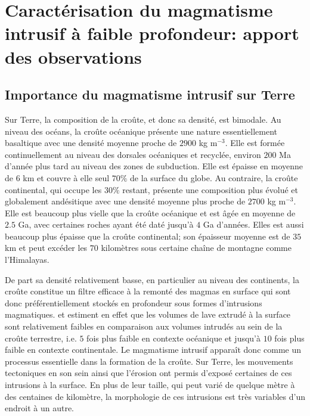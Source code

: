 \section{Caractérisation du  magmatisme intrusif à  faible profondeur:
  apport des observations}
\label{sec:zool-des-intr}

\subsection{Importance du magmatisme intrusif sur Terre}
\label{sec:definition}

Sur  Terre, la  composition  de la  croûte, et  donc  sa densité,  est
bimodale.   Au niveau  des océans,  la croûte  océanique présente  une
nature essentiellement  basaltique avec une densité  moyenne proche de
$2900$ kg  m$^{-3}$.  Elle  est formée  continuellement au  niveau des
dorsales océaniques et recyclée, environ $200$ Ma d'année plus tard au
niveau des zones de subduction. Elle  est épaisse en moyenne de $6$ km
et couvre à elle seul $70\%$ de  la surface du globe. Au contraire, la
croûte  continental,  qui  occupe  les $30\%$  restant,  présente  une
composition plus  évolué et  globalement andésitique avec  une densité
moyenne plus  proche de  $2700$ kg m$^{-3}$.   Elle est  beaucoup plus
vielle que  la croûte océanique  et est âgée  en moyenne de  $2.5$ Ga,
avec certaines roches  ayant été daté jusqu'à $4$  Ga d'années.  Elles
est  aussi  beaucoup  plus  épaisse que  la  croûte  continental;  son
épaisseur moyenne est  de $35$ km et peut excéder  les $70$ kilomètres
sous certaine chaîne de montagne comme l'Himalayas.

De part  sa densité relativement  basse, en particulier au  niveau des
continents, la  croûte constitue un  filtre efficace à la  remonté des
magmas  en  surface  qui   sont  donc  préférentiellement  stockés  en
profondeur sous formes d'intrusions magmatiques.  \citet{Crisp:1984dm}
et  \citet{White:2006gr} estiment  en effet  que les  volumes de  lave
extrudé  à la  surface sont  relativement faibles  en comparaison  aux
volumes intrudés  au sein de la  croûte terrestre, i.e. $5$  fois plus
faible  en contexte  océanique et  jusqu'à  $10$ fois  plus faible  en
contexte continentale.  Le magmatisme  intrusif apparaît donc comme un
processus essentielle dans la formation  de la croûte.  Sur Terre, les
mouvements  tectoniques en  son sein  ainsi que  l’érosion ont  permis
d'exposé certaines  de ces intrusions à  la surface.  En plus  de leur
taille, qui peut varié de quelque  mètre à des centaines de kilomètre,
la morphologie de ces intrusions est  très variables d'un endroit à un
autre.

